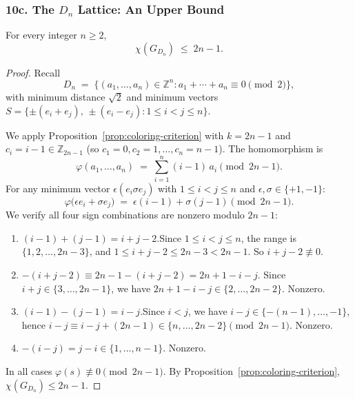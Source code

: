 \subsubsection*{10c. The $D_n$ Lattice: An Upper Bound}

\begin{theorem}\label{thm:Dn-coloring}
For every integer $n \ge 2$,
\[
  \chi(G_{D_n}) \;\le\; 2n - 1.
\]
\end{theorem}

\begin{proof}
Recall
\[
  D_n \;=\; \bigl\{(a_1, \ldots, a_n) \in \mathbb{Z}^n : a_1 + \cdots + a_n \equiv 0 \pmod{2}\bigr\},
\]
with minimum distance $\sqrt{2}$ and minimum vectors $S = \{\pm(e_i + e_j),\, \pm(e_i - e_j) : 1 \le i < j \le n\}$.

We apply Proposition~\ref{prop:coloring-criterion} with $k = 2n-1$ and $c_i = i-1 \in \mathbb{Z}_{2n-1}$ (so $c_1=0, c_2=1, \ldots, c_n=n-1$).  The homomorphism is
\[
  \varphi(a_1, \ldots, a_n) \;=\; \sum_{i=1}^n (i-1)\,a_i \pmod{2n-1}.
\]
For any minimum vector $\epsilon(e_i \sigma e_j)$ with $1 \le i < j \le n$ and $\epsilon, \sigma \in \{+1,-1\}$:
\[
  \varphi\bigl(\epsilon e_i + \sigma e_j\bigr) \;=\; \epsilon(i-1) + \sigma(j-1) \pmod{2n-1}.
\]
We verify all four sign combinations are nonzero modulo $2n-1$:
\begin{enumerate}
  \item[\textup{(+,+)}] $(i-1)+(j-1) = i+j-2$.\quad  Since $1 \le i < j \le n$, the range is $\{1,2,\ldots, 2n-3\}$, and $1 \le i+j-2 \le 2n-3 < 2n-1$.  So $i+j-2 \not\equiv 0$.
  \item[\textup{($-$,$-$)}] $-(i+j-2) \equiv 2n-1-(i+j-2) = 2n+1-i-j$. Since $i+j \in \{3,\ldots,2n-1\}$, we have $2n+1-i-j \in \{2,\ldots,2n-2\}$.  Nonzero.
  \item[\textup{(+,$-$)}] $(i-1)-(j-1) = i-j$.\quad  Since $i < j$, we have $i-j \in \{-(n-1), \ldots, -1\}$, hence $i-j \equiv i-j+(2n-1) \in \{n, \ldots, 2n-2\} \pmod{2n-1}$.  Nonzero.
  \item[\textup{($-$,+)}] $-(i-j) = j-i \in \{1, \ldots, n-1\}$.  Nonzero.
\end{enumerate}
In all cases $\varphi(s) \not\equiv 0 \pmod{2n-1}$.  By Proposition~\ref{prop:coloring-criterion}, $\chi(G_{D_n}) \le 2n-1$.
\end{proof}

